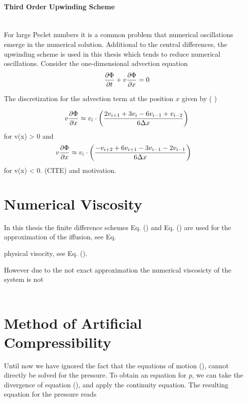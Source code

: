 \paragraph{Third Order Upwinding Scheme}\mbox{}\\

For large Peclet numbers it is a common problem that numerical oscillations emerge in the numerical solution.
Additional to the central differences, the upwinding scheme is used in this thesis which tends to reduce
numerical oscillations. Consider the one-dimensional advection equation
\begin{align}
    \pdn[\Phi]{t} + v\pdn[\Phi]{x} = 0
\end{align}

The discretization for the advection term at the position $x$ given by ( \citep{udtriaend })

\begin{align}
    v\pdn[\Phi]{x} &\approx  v_i \cdot \left(\frac{2v_{i+1} + 3v_i     - 6v_{i-1} + v_{i-2}}{6\Delta x}\right)\\
\end{align}
for v(x) > 0 and
\begin{align}
    v\pdn[\Phi]{x} &\approx  v_i \cdot \left( \frac{-v_{i+2} + 6v_{i+1} - 3v_{i-1} - 2v_{i-1}}{6\Delta x}\right)
\end{align}
for v(x) < 0. (CITE) and motivation.

\newpage

\section{Numerical Viscosity}

In this thesis the finite difference schemes Eq. () and Eq. () are
used for the approximation of the iffusion, see Eq. \label{num:vne_diffusion_theo}

 physical visocity, see Eq. ().

However due to the not exact approximation the numerical viscosicty of the system is not

\begin{align}
 \label{NUMERIC:NUMVIS}
\end{align}


\section{Method of Artificial Compressibility}

Until now we have ignored the fact that the equations of motion (), cannot directly be solved for the pressure.
To obtain an equation for $p$, we can take the divergence of equation (), and apply the continuity equation.
The resulting equation for the pressure reads

